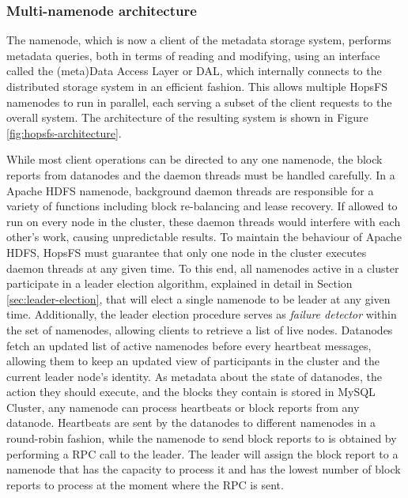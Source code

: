 \subsubsection{Multi-namenode architecture}
The namenode, which is now a client of the metadata storage system, performs metadata queries, both in terms of reading and modifying, using an interface called the (meta)Data Access Layer or DAL, which internally connects to the distributed storage system in an efficient fashion.
This allows multiple HopsFS namenodes to run in parallel, each serving a subset of the client requests to the overall system.
The architecture of the resulting system is shown in Figure \ref{fig:hopsfs-architecture}.

While most client operations can be directed to any one namenode, the block reports from datanodes and the daemon threads must be handled carefully.
In a Apache HDFS namenode, background daemon threads are responsible for a variety of functions including block re-balancing and lease recovery.
If allowed to run on every node in the cluster, these daemon threads would interfere with each other's work, causing unpredictable results.
To maintain the behaviour of Apache HDFS, HopsFS must guarantee that only one node in the cluster executes daemon threads at any given time.
To this end, all namenodes active in a cluster participate in a leader election algorithm, explained in detail in Section \ref{sec:leader-election}, that will elect a single namenode to be leader at any given time.
Additionally, the leader election procedure serves as \emph{failure detector} within the set of namenodes, allowing clients to retrieve a list of live nodes.
Datanodes fetch an updated list of active namenodes before every heartbeat messages, allowing them to keep an updated view of participants in the cluster and the current leader node's identity.
As metadata about the state of datanodes, the action they should execute, and the blocks they contain is stored in MySQL Cluster, any namenode can process heartbeats or block reports from any datanode.
Heartbeats are sent by the datanodes to different namenodes in a round-robin fashion, while the namenode to send block reports to is obtained by performing a RPC call to the leader.
The leader will assign the block report to a namenode that has the capacity to process it and has the lowest number of block reports to process at the moment where the RPC is sent.

